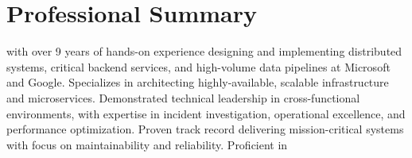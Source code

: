 
\section{Professional Summary}
\normalsize{\POSITION{} with over 9 years of hands-on experience designing and implementing distributed systems, critical backend services, and high-volume data pipelines at Microsoft and Google. Specializes in architecting highly-available, scalable infrastructure and microservices. Demonstrated technical leadership in cross-functional environments, with expertise in incident investigation, operational excellence, and performance optimization. Proven track record delivering mission-critical systems with focus on maintainability and reliability. Proficient in \LanguagesOrderSummary\MainTechnologies}